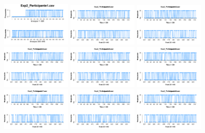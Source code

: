 \documentclass[a4paper ]{article}
\begin{document}
\begin{figure}[th]
\centering
\includegraphics[width=0.3\textwidth]{Figures/Response_Exp2_P1} \includegraphics[width=0.3\textwidth]{Figures/Response_Exp2_P2} \includegraphics[width=0.3\textwidth]{Figures/Response_Exp2_P3}
\includegraphics[width=0.3\textwidth]{Figures/Response_Exp2_P4} \includegraphics[width=0.3\textwidth]{Figures/Response_Exp2_P5} \includegraphics[width=0.3\textwidth]{Figures/Response_Exp2_P6}
\includegraphics[width=0.3\textwidth]{Figures/Response_Exp2_P7} \includegraphics[width=0.3\textwidth]{Figures/Response_Exp2_P8} \includegraphics[width=0.3\textwidth]{Figures/Response_Exp2_P9}

\end{figure}
\end{document}
